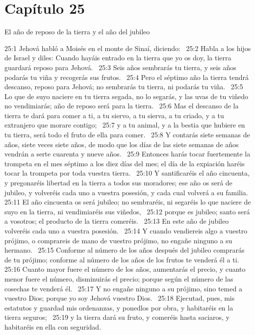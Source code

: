 \section*{Capítulo 25}
El año de reposo de la tierra y el año del jubileo  

25:1 Jehová habló a Moisés en el monte de Sinaí, diciendo:  
25:2 Habla a los hijos de Israel y diles: Cuando hayáis entrado en la tierra que yo os doy, la tierra guardará reposo para Jehová.  
25:3 Seis años sembrarás tu tierra, y seis años podarás tu viña y recogerás sus frutos.  
25:4 Pero el séptimo año la tierra tendrá descanso, reposo para Jehová; no sembrarás tu tierra, ni podarás tu viña.  
25:5 Lo que de suyo naciere en tu tierra segada, no lo segarás, y las uvas de tu viñedo no vendimiarás; año de reposo será para la tierra.  
25:6 Mas el descanso de la tierra te dará para comer a ti, a tu siervo, a tu sierva, a tu criado, y a tu extranjero que morare contigo;  
25:7 y a tu animal, y a la bestia que hubiere en tu tierra, será todo el fruto de ella para comer.  
25:8 Y contarás siete semanas de años, siete veces siete años, de modo que los días de las siete semanas de años vendrán a serte cuarenta y nueve años.  
25:9 Entonces harás tocar fuertemente la trompeta en el mes séptimo a los diez días del mes; el día de la expiación haréis tocar la trompeta por toda vuestra tierra.  
25:10 Y santificaréis el año cincuenta, y pregonaréis libertad en la tierra a todos sus moradores; ese año os será de jubileo, y volveréis cada uno a vuestra posesión, y cada cual volverá a su familia.  
25:11 El año cincuenta os será jubileo; no sembraréis, ni segaréis lo que naciere de suyo en la tierra, ni vendimiaréis sus viñedos,  
25:12 porque es jubileo; santo será a vosotros; el producto de la tierra comeréis.  
25:13 En este año de jubileo volveréis cada uno a vuestra posesión.  
25:14 Y cuando vendiereis algo a vuestro prójimo, o comprareis de mano de vuestro prójimo, no engañe ninguno a su hermano.  
25:15 Conforme al número de los años después del jubileo comprarás de tu prójimo; conforme al número de los años de los frutos te venderá él a ti.  
25:16 Cuanto mayor fuere el número de los años, aumentarás el precio, y cuanto menor fuere el número, disminuirás el precio; porque según el número de las cosechas te venderá él.  
25:17 Y no engañe ninguno a su prójimo, sino temed a vuestro Dios; porque yo soy Jehová vuestro Dios.  
25:18 Ejecutad, pues, mis estatutos y guardad mis ordenanzas, y ponedlos por obra, y habitaréis en la tierra seguros;  
25:19 y la tierra dará su fruto, y comeréis hasta saciaros, y habitaréis en ella con seguridad.  
